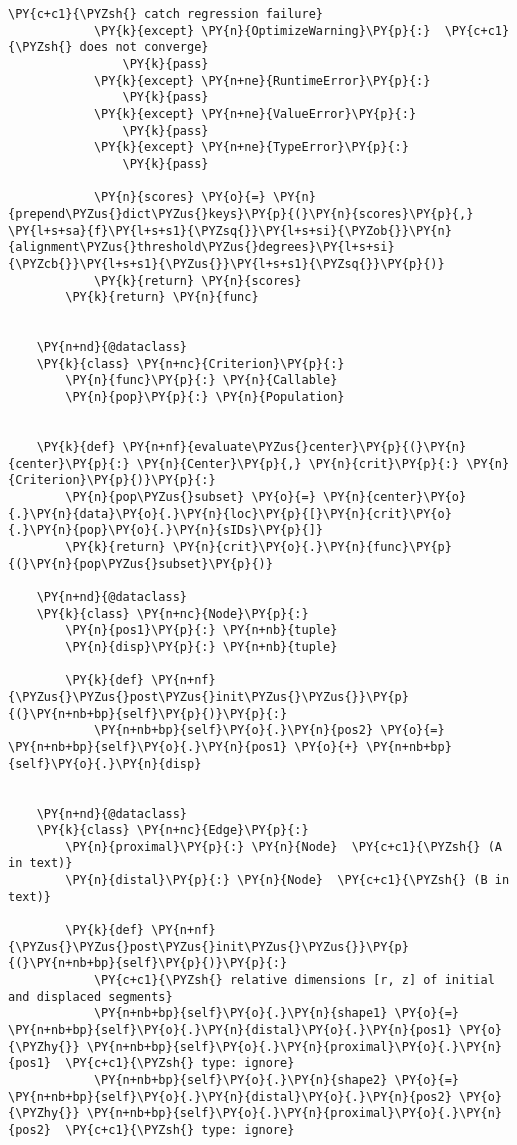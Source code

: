 \begin{tcolorbox}[breakable, size=fbox, boxrule=1pt, pad at break*=1mm,colback=cellbackground, colframe=cellborder]
\begin{Verbatim}[commandchars=\\\{\}]
            \PY{c+c1}{\PYZsh{} catch regression failure}
            \PY{k}{except} \PY{n}{OptimizeWarning}\PY{p}{:}  \PY{c+c1}{\PYZsh{} does not converge}
                \PY{k}{pass}
            \PY{k}{except} \PY{n+ne}{RuntimeError}\PY{p}{:}
                \PY{k}{pass}
            \PY{k}{except} \PY{n+ne}{ValueError}\PY{p}{:}
                \PY{k}{pass}
            \PY{k}{except} \PY{n+ne}{TypeError}\PY{p}{:}
                \PY{k}{pass}
    
            \PY{n}{scores} \PY{o}{=} \PY{n}{prepend\PYZus{}dict\PYZus{}keys}\PY{p}{(}\PY{n}{scores}\PY{p}{,} \PY{l+s+sa}{f}\PY{l+s+s1}{\PYZsq{}}\PY{l+s+si}{\PYZob{}}\PY{n}{alignment\PYZus{}threshold\PYZus{}degrees}\PY{l+s+si}{\PYZcb{}}\PY{l+s+s1}{\PYZus{}}\PY{l+s+s1}{\PYZsq{}}\PY{p}{)}
            \PY{k}{return} \PY{n}{scores}
        \PY{k}{return} \PY{n}{func}
    
    
    \PY{n+nd}{@dataclass}
    \PY{k}{class} \PY{n+nc}{Criterion}\PY{p}{:}
        \PY{n}{func}\PY{p}{:} \PY{n}{Callable}
        \PY{n}{pop}\PY{p}{:} \PY{n}{Population}
    
    
    \PY{k}{def} \PY{n+nf}{evaluate\PYZus{}center}\PY{p}{(}\PY{n}{center}\PY{p}{:} \PY{n}{Center}\PY{p}{,} \PY{n}{crit}\PY{p}{:} \PY{n}{Criterion}\PY{p}{)}\PY{p}{:}
        \PY{n}{pop\PYZus{}subset} \PY{o}{=} \PY{n}{center}\PY{o}{.}\PY{n}{data}\PY{o}{.}\PY{n}{loc}\PY{p}{[}\PY{n}{crit}\PY{o}{.}\PY{n}{pop}\PY{o}{.}\PY{n}{sIDs}\PY{p}{]}
        \PY{k}{return} \PY{n}{crit}\PY{o}{.}\PY{n}{func}\PY{p}{(}\PY{n}{pop\PYZus{}subset}\PY{p}{)}
    
    \PY{n+nd}{@dataclass}
    \PY{k}{class} \PY{n+nc}{Node}\PY{p}{:}
        \PY{n}{pos1}\PY{p}{:} \PY{n+nb}{tuple}
        \PY{n}{disp}\PY{p}{:} \PY{n+nb}{tuple}
    
        \PY{k}{def} \PY{n+nf}{\PYZus{}\PYZus{}post\PYZus{}init\PYZus{}\PYZus{}}\PY{p}{(}\PY{n+nb+bp}{self}\PY{p}{)}\PY{p}{:}
            \PY{n+nb+bp}{self}\PY{o}{.}\PY{n}{pos2} \PY{o}{=} \PY{n+nb+bp}{self}\PY{o}{.}\PY{n}{pos1} \PY{o}{+} \PY{n+nb+bp}{self}\PY{o}{.}\PY{n}{disp}
    
    
    \PY{n+nd}{@dataclass}
    \PY{k}{class} \PY{n+nc}{Edge}\PY{p}{:}
        \PY{n}{proximal}\PY{p}{:} \PY{n}{Node}  \PY{c+c1}{\PYZsh{} (A in text)}
        \PY{n}{distal}\PY{p}{:} \PY{n}{Node}  \PY{c+c1}{\PYZsh{} (B in text)}
    
        \PY{k}{def} \PY{n+nf}{\PYZus{}\PYZus{}post\PYZus{}init\PYZus{}\PYZus{}}\PY{p}{(}\PY{n+nb+bp}{self}\PY{p}{)}\PY{p}{:}
            \PY{c+c1}{\PYZsh{} relative dimensions [r, z] of initial and displaced segments}
            \PY{n+nb+bp}{self}\PY{o}{.}\PY{n}{shape1} \PY{o}{=} \PY{n+nb+bp}{self}\PY{o}{.}\PY{n}{distal}\PY{o}{.}\PY{n}{pos1} \PY{o}{\PYZhy{}} \PY{n+nb+bp}{self}\PY{o}{.}\PY{n}{proximal}\PY{o}{.}\PY{n}{pos1}  \PY{c+c1}{\PYZsh{} type: ignore}
            \PY{n+nb+bp}{self}\PY{o}{.}\PY{n}{shape2} \PY{o}{=} \PY{n+nb+bp}{self}\PY{o}{.}\PY{n}{distal}\PY{o}{.}\PY{n}{pos2} \PY{o}{\PYZhy{}} \PY{n+nb+bp}{self}\PY{o}{.}\PY{n}{proximal}\PY{o}{.}\PY{n}{pos2}  \PY{c+c1}{\PYZsh{} type: ignore}
    

\end{Verbatim}
\end{tcolorbox}
